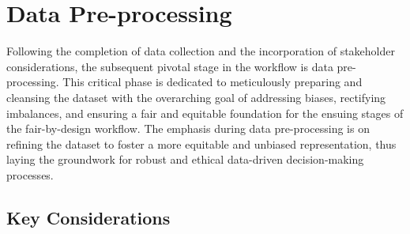 \documentclass[12pt,a4paper,openright,twoside]{book}
\begin{document}
\section{Data Pre-processing}
\label{section:pre-proc}

Following the completion of data collection and the incorporation of stakeholder considerations, the subsequent pivotal stage in the workflow is data pre-processing. This critical phase is dedicated to meticulously preparing and cleansing the dataset with the overarching goal of addressing biases, rectifying imbalances, and ensuring a fair and equitable foundation for the ensuing stages of the fair-by-design workflow. The emphasis during data pre-processing is on refining the dataset to foster a more equitable and unbiased representation, thus laying the groundwork for robust and ethical data-driven decision-making processes.

\subsection{Key Considerations}
\end{document}
